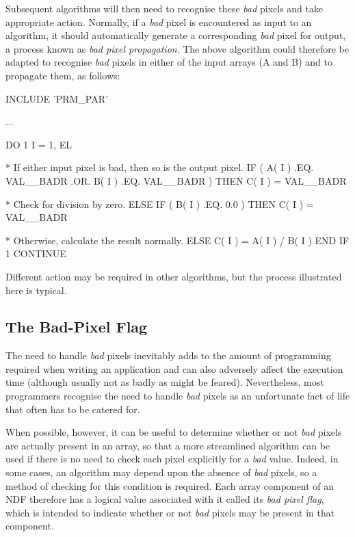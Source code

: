\documentclass[twoside,11pt,nolof]{starlink}
\providecommand{\st}[1]{{\emph{#1}}}
\begin{document}
Subsequent algorithms will then need to recognise these \st{bad\/} pixels and
take appropriate action.
Normally, if a \st{bad\/} pixel is encountered as input to an algorithm, it
should automatically generate a corresponding \st{bad\/} pixel for output, a
process known as \st{bad pixel propagation}.
The above algorithm could therefore be adapted to recognise \st{bad\/} pixels
in either of the input arrays (A and B) and to propagate them, as follows:

\small
\begin{terminalv}
      INCLUDE 'PRM_PAR'

      ...

      DO 1 I = 1, EL

*  If either input pixel is bad, then so is the output pixel.
         IF ( A( I ) .EQ. VAL__BADR .OR. B( I ) .EQ. VAL__BADR ) THEN
            C( I ) = VAL__BADR

*  Check for division by zero.
         ELSE IF ( B( I ) .EQ. 0.0 ) THEN
            C( I ) = VAL__BADR

*  Otherwise, calculate the result normally.
         ELSE
            C( I ) = A( I ) / B( I )
         END IF
 1    CONTINUE
\end{terminalv}
\normalsize

Different action may be required in other algorithms, but the process
illustrated here is typical.

\subsection{\label{ss:noexplicitchecks}The Bad-Pixel Flag}

The need to handle \st{bad\/} pixels inevitably adds to the amount of
programming required when writing an application and can also adversely
affect the execution time (although usually not as badly as might be
feared).
Nevertheless, most programmers recognise the need to handle \st{bad\/} pixels
as an unfortunate fact of life that often has to be catered for.

When possible, however, it can be useful to determine whether or not
\st{bad\/} pixels are actually present in an array, so that a more
streamlined
algorithm can be used if there is no need to check each pixel explicitly for
a \st{bad\/} value.
Indeed, in some cases, an algorithm may depend upon the absence of \st{bad\/}
pixels, so a method of checking for this condition is required.
Each array component of an NDF therefore has a logical value associated with
it called its \st{bad pixel flag}, which is intended to indicate whether or
not \st{bad\/} pixels may be present in that component.
\end{document}
